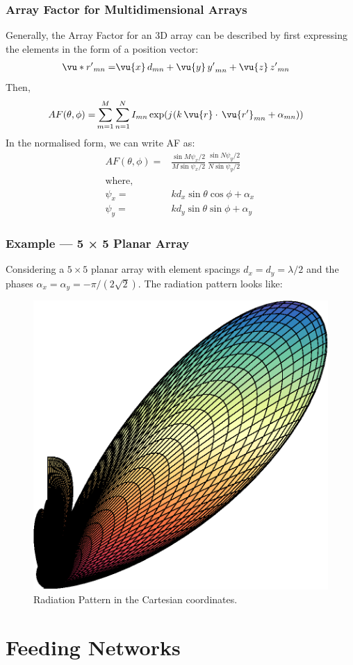 \documentclass[10pt]{beamer}
\renewcommand{\j}{{j}\mkern1mu} %
\begin{document}
\begin{frame}
    \frametitle{Array Factor for Multidimensional Arrays}
    Generally, the Array Factor for an 3D array can be described by first expressing the elements in the form of a position vector:
    \small
    \begin{align*}
        \vu*{r'}_{mn} {}=& \vu{x} \, {d}_{mn} + \vu{y} \, {y'}_{mn} + \vu{z} \, {z'}_{mn}
    \end{align*}
    Then,
    \begin{align*}
        AF (\theta, \phi ) {}=& \sum_{m = 1}^{M} \sum_{n = 1}^{N} I_{mn} \exp(\j (k \, \vu{r}\cdot \, \vu{r'}_{mn} + \alpha_{mn}))
    \end{align*}
    In the normalised form, we can write AF as:
    \begin{align*}
        AF (\theta, \phi) {}=&  \frac{\sin M \psi_x/2 }{{M \sin \psi_x/2}} \, \frac{\sin N \psi_y/2 }{{N \sin \psi_y/2}} \\
        \text{where,} \\
        \psi_x  {}=& k d_x \sin \theta \cos \phi + \alpha_x \, \\
        \psi_y  {}=& k d_y \sin \theta \sin \phi + \alpha_y
    \end{align*}
\end{frame}

\begin{frame}
    \frametitle{Example — 5 × 5 Planar Array}

    Considering a $5 \times 5$ planar array with element spacings $d_x = d_y =  \lambda/2$ and the phases $\alpha_x = \alpha_y = -\pi/(2 \sqrt{2})$. The radiation pattern looks like:
    \begin{figure}[htbp]
        \centering
        \includegraphics[width=.35\textwidth]{3d_polar_plot_3.eps}
        \caption{Radiation Pattern in the Cartesian coordinates.}
    \end{figure}
\end{frame}

\section{Feeding Networks}
\end{document}

